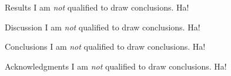 \documentclass{beamer}
\begin{document}
\begin{frame}[t]{}
\begin{columns}
\begin{column}{.45\textwidth}
\begin{block}{Results}
        I am \emph{not} qualified to draw conclusions.  Ha!
      \end{block}
      \begin{block}{Discussion} %
        I am \emph{not} qualified to draw conclusions.  Ha!
      \end{block}
      \begin{block}{Conclusions} %
        I am \emph{not} qualified to draw conclusions.  Ha!
      \end{block}
      \begin{block}{Acknowledgments} %
        I am \emph{not} qualified to draw conclusions.  Ha!
      \end{block}
    \end{column}
  \end{columns}
\end{frame}
\end{document}
